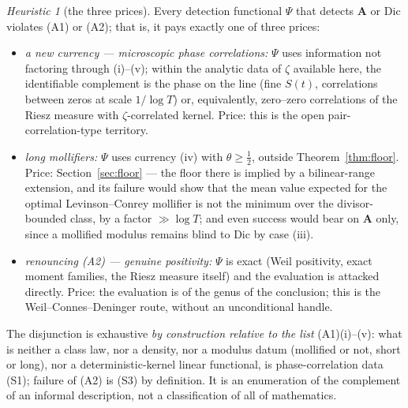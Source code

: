 \documentclass[11pt]{amsart}
\theoremstyle{plain}
\theoremstyle{definition}
\theoremstyle{remark}
\newtheorem{heuristic}[theorem]{Heuristic}
\newcommand{\Dic}{\mathrm{Dic}}
\newcommand{\Aax}{\mathbf{A}}
\begin{document}
\begin{heuristic}[the three prices]\label{thm:prices}
Every detection functional $\Psi$ that detects $\Aax$ or $\Dic$ violates \textup{(A1)} or \textup{(A2)}; that is, it pays exactly one of three prices:
\begin{itemize}
\item[\textup{(S1)}] \emph{a new currency --- microscopic phase correlations:} $\Psi$ uses information not factoring through \textup{(i)--(v)}; within the analytic data of $\zeta$ available here, the identifiable complement is the phase on the line \textup{(}fine $S(t)$, correlations between zeros at scale $1/\log T$\textup{)} or, equivalently, zero--zero correlations of the Riesz measure with $\zeta$-correlated kernel. Price: this is the open pair-correlation-type territory.
\item[\textup{(S2)}] \emph{long mollifiers:} $\Psi$ uses currency \textup{(iv)} with $\theta\ge\tfrac12$, outside Theorem~\ref{thm:floor}. Price: Section~\ref{sec:floor} --- the floor there is implied by a bilinear-range extension, and its failure would show that the mean value expected for the optimal Levinson--Conrey mollifier \cite{Farmer1993,BettinGonek2017} is not the minimum over the divisor-bounded class, by a factor $\gg\log T$; and even success would bear on $\Aax$ only, since a mollified modulus remains blind to $\Dic$ by case \textup{(iii)}.
\item[\textup{(S3)}] \emph{renouncing \textup{(A2)} --- genuine positivity:} $\Psi$ is exact \textup{(}Weil positivity, exact moment families, the Riesz measure itself\textup{)} and the evaluation is attacked directly. Price: the evaluation is of the genus of the conclusion; this is the Weil--Connes--Deninger route, without an unconditional handle.
\end{itemize}
The disjunction is exhaustive \emph{by construction relative to the list} \textup{(A1)(i)--(v)}: what is neither a class law, nor a density, nor a modulus datum \textup{(}mollified or not, short or long\textup{)}, nor a deterministic-kernel linear functional, is phase-correlation data \textup{(S1)}; failure of \textup{(A2)} is \textup{(S3)} by definition. It is an enumeration of the complement of an informal description, not a classification of all of mathematics.
\end{heuristic}
\end{document}
